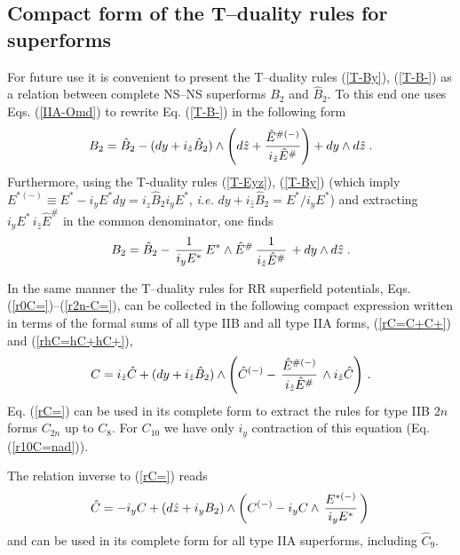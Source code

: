 \documentclass[a4paper,11pt]{article}
\begin{document}
\subsection{Compact form of the T--duality rules for superforms}

For future use it is convenient to 
present the T--duality rules (\ref{T-By}), 
(\ref{T-B-}) as a relation between complete NS--NS superforms 
${{B}}_2$ and   $\hat{{B}}_2$. To this end one uses 
Eqs. (\ref{IIA-Omd}) to rewrite Eq. (\ref{T-B-})  in the following form
\begin{equation}\label{TBsg}
{{B}}_2=  \hat{{B}}_2 -
(dy + i_{\hat{z}} \hat{B}_2) \wedge
\left(d\hat{z}+ {\hat{E}^{ {\#}(-)}
\over i_{\hat{z}}\hat{E}^{ {\#}}}\right) + dy \wedge d\hat{z}\; .   
\end{equation} 
Furthermore, using the T-duality rules (\ref{T-Eyz}), 
(\ref{T-By}) 
(which imply $E^{*(-)}\equiv E^{*}- i_yE^{*} dy
= i_{\hat{z}}\hat{B}_2 i_y E^{*}$, {\it  i.e.}  
$dy+ i_{\hat{z}}\hat{B}_2= E^* /i_y E^{*}$)  
and extracting 
$i_{y}{E}^{ {*}}\, i_{\hat{z}}\hat{E}^{ {\#}}$ in the 
common denominator, one finds 
\begin{equation}
\label{rTdB2} 
B_2 = \hat{B}_2 - \, 
{1\over i_{y}{E}^{ {*}}} \, 
E^{ {*}} \wedge \hat{E}^{ {\# }} \,
{1\over i_{\hat{z}}\hat{E}^{ {\#}}}\, 
+ dy  \wedge d\hat{z} \; .
\end{equation}



In the same manner the T--duality rules for RR superfield potentials, 
Eqs. (\ref{r0C=})--(\ref{r2n-C=}),  can be collected in the following 
compact expression written in terms of the formal sums 
of all type IIB and all type IIA forms, (\ref{rC=C+C+}) and 
(\ref{rhC=hC+hC+}),  
\begin{equation}
\label{rC=} 
C= i_{\hat{z}}\hat{C} + (dy +i_{\hat{z}} \hat{B}_2) \wedge 
\left(\hat{C}^{(-)} -  \,
{\hat{E}^{ {\#}(-)}\over i_{\hat{z}}\hat{E}^{ {\#}}}\, 
\wedge 
i_{\hat{z}} \hat{C} \right)\, .
\end{equation}
Eq. (\ref{rC=}) can be used in its complete form to extract the 
rules for type IIB $2n$ forms $C_{2n}$ up to $C_8$. 
For $C_{10}$ we have only $i_y$ contraction of this equation 
(Eq. (\ref{r10C=nad})). 

The relation inverse to (\ref{rC=}) reads 
\begin{equation}\label{rhC=}
\hat{C} = - i_y C + (d\hat{z}+ i_yB_2)\wedge 
\left(C^{(-)}- i_y C \wedge \,
 {{E}^{ {*}(-)}\over i_{y}{E}^{ {*}}}\, \right)
\, 
\end{equation}
and can be used in its complete form for all type IIA superforms, including 
$\hat{C}_9$. 
\end{document}
